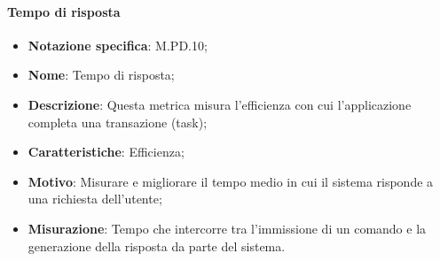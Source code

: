 \paragraph*{Tempo di risposta}
\begin{itemize}
    \item \textbf{Notazione specifica}: M.PD.10;
    \item \textbf{Nome}: Tempo di risposta;
    \item \textbf{Descrizione}: Questa metrica misura l'efficienza con cui l'applicazione completa una transazione (task);
    \item \textbf{Caratteristiche}: Efficienza;
    \item \textbf{Motivo}: Misurare e migliorare il tempo medio in cui il sistema risponde a una richiesta dell'utente;
    \item \textbf{Misurazione}: Tempo che intercorre tra l'immissione di un comando e la generazione della risposta da parte del sistema.
\end{itemize}
